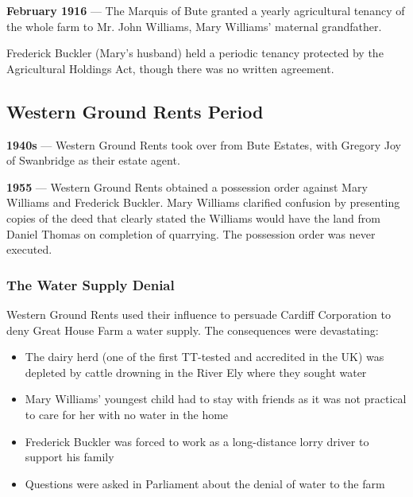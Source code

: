 \documentclass[11pt,a4paper]{article}
\begin{document}
\begin{timeline}
\textbf{February 1916} --- The Marquis of Bute granted a yearly agricultural tenancy of the whole farm to Mr. John Williams, Mary Williams' maternal grandfather.
\end{timeline}

Frederick Buckler (Mary's husband) held a periodic tenancy protected by the Agricultural Holdings Act, though there was no written agreement.

\subsection{Western Ground Rents Period}

\begin{timeline}
\textbf{1940s} --- Western Ground Rents took over from Bute Estates, with Gregory Joy of Swanbridge as their estate agent.
\end{timeline}

\begin{timeline}
\textbf{1955} --- Western Ground Rents obtained a possession order against Mary Williams and Frederick Buckler. Mary Williams clarified confusion by presenting copies of the deed that clearly stated the Williams would have the land from Daniel Thomas on completion of quarrying. The possession order was never executed.
\end{timeline}

\subsubsection{The Water Supply Denial}

\begin{grievance}
Western Ground Rents used their influence to persuade Cardiff Corporation to deny Great House Farm a water supply. The consequences were devastating:
\begin{itemize}
    \item The dairy herd (one of the first TT-tested and accredited in the UK) was depleted by cattle drowning in the River Ely where they sought water
    \item Mary Williams' youngest child had to stay with friends as it was not practical to care for her with no water in the home
    \item Frederick Buckler was forced to work as a long-distance lorry driver to support his family
    \item Questions were asked in Parliament about the denial of water to the farm
\end{itemize}
\end{grievance}
\end{document}

